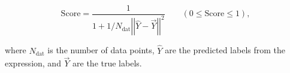 \documentclass[runningheads]{llncs}
\begin{document}
\begin{equation}
\mathrm{Score} = \frac{1}{1+ 1/N_{\mathrm{dat}}\left|\left|\hat{Y}-\vec{Y}\right|\right|^2} \qquad  (0 \leq \mathrm{Score} \leq 1), \label{eq:score_formula}
\end{equation}

where $N_{\mathrm{dat}}$ is the number of data points, $\hat{Y}$ are the predicted labels from the expression, and $\vec{Y}$ are the true labels.

\end{document}
